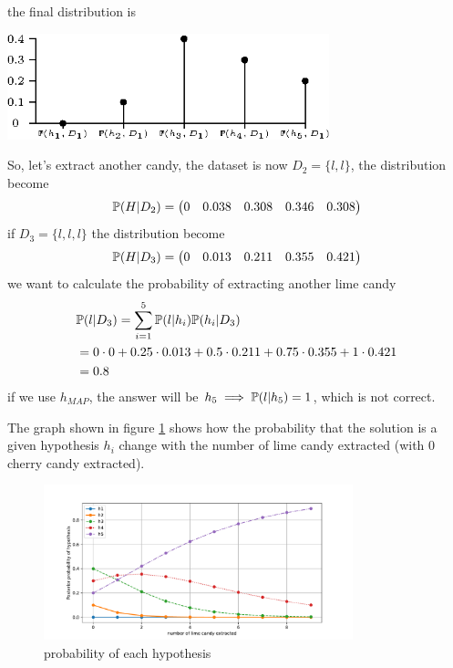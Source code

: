 \documentclass[10pt, letterpaper]{report}
\begin{document}
the final distribution is
\begin{center}
    \includegraphics[width=0.7\textwidth]{images/distr_candy.eps}
\end{center}
So, let's extract another candy, the dataset is now $D_2=\{l,l\}$, the distribution become\begin{equation}
    {\mathbb P}(H|D_2) = \begin{pmatrix}
        0&0.038&0.308&0.346&0.308
    \end{pmatrix}
\end{equation}
if $D_3=\{l,l,l\}$ the distribution become\begin{equation}
    {\mathbb P}(H|D_3) = \begin{pmatrix}
        0&0.013&0.211&0.355&0.421
    \end{pmatrix}
\end{equation}
we want to calculate the probability of extracting another lime candy\begin{align*}
    &{\mathbb P}(l|D_3)=\sum_{i=1}^5{\mathbb P}(l|h_i){\mathbb P}(h_i|D_3)\\
    &= 0 \cdot 0 + 0.25 \cdot 0.013 + 0.5 \cdot 0.211 + 0.75 \cdot 0.355 + 1 \cdot 0.421\\
    &=0.8
\end{align*}
if we use $h_{MAP}$, the answer will be $h_5\implies {\mathbb P}(l|h_5)=1$, which is not correct.\bigskip

The graph shown in figure \ref{img:candy_graph} shows how the probability that the solution is a given hypothesis $h_i$ change with the number of lime candy extracted (with 0 cherry candy extracted).

\begin{figure}[h!]
    \centering
    \includegraphics[width=0.8\textwidth]{images/candy_graph.pdf}
    \caption{probability of each hypothesis}
    \label{img:candy_graph}
\end{figure}

\end{document}
